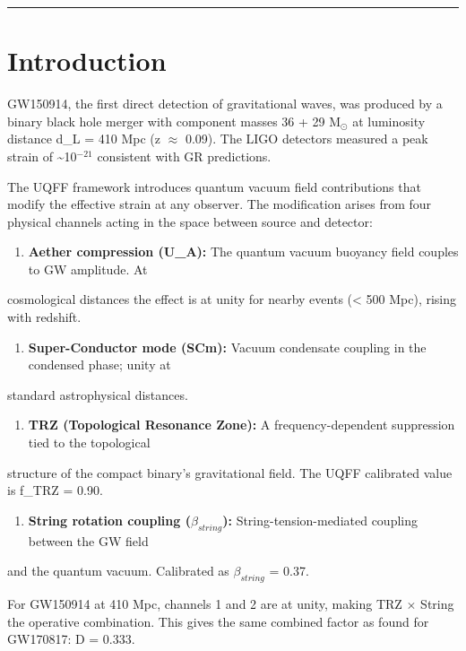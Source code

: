 \documentclass[12pt,a4paper]{article}
\begin{document}
\medskip\hrule\medskip

\section{Introduction}

GW150914, the first direct detection of gravitational waves, was produced by a binary black hole merger with component masses 36 + 29 M$_\odot$ at luminosity distance d\_L = 410 Mpc (z $\approx$ 0.09). The LIGO detectors measured a peak strain of \textasciitilde{}10$^{-21}$ consistent with GR predictions.

The UQFF framework introduces quantum vacuum field contributions that modify the effective strain at any observer. The modification arises from four physical channels acting in the space between source and detector:

\begin{enumerate}
  \item \textbf{Aether compression (U\_A):} The quantum vacuum buoyancy field couples to GW amplitude. At
\end{enumerate}

cosmological distances the effect is at unity for nearby events (< 500 Mpc), rising with redshift.

\begin{enumerate}
  \item \textbf{Super-Conductor mode (SCm):} Vacuum condensate coupling in the condensed phase; unity at
\end{enumerate}

standard astrophysical distances.

\begin{enumerate}
  \item \textbf{TRZ (Topological Resonance Zone):} A frequency-dependent suppression tied to the topological
\end{enumerate}

structure of the compact binary's gravitational field. The UQFF calibrated value is f\_TRZ = 0.90.

\begin{enumerate}
  \item \textbf{String rotation coupling ($\beta_{string}$):} String-tension-mediated coupling between the GW field
\end{enumerate}

and the quantum vacuum. Calibrated as $\beta_{string}$ = 0.37.

For GW150914 at 410 Mpc, channels 1 and 2 are at unity, making TRZ $\times$ String the operative combination. This gives the same combined factor as found for GW170817: D = 0.333.
\end{document}

